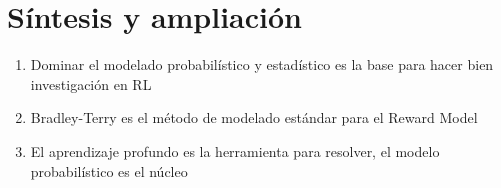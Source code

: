 \section{Síntesis y ampliación}
\begin{enumerate}
  \item Dominar el modelado probabilístico y estadístico es la base para hacer bien investigación en RL
  \item Bradley-Terry es el método de modelado estándar para el Reward Model
  \item El aprendizaje profundo es la herramienta para resolver, el modelo probabilístico es el núcleo
\end{enumerate}

